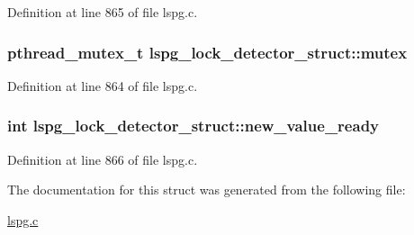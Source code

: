 Definition at line 865 of file lspg.\-c.

\hypertarget{structlspg__lock__detector__struct_ab5ab5534b376a8fbafdd0b54cec4483c}{
\subsubsection[{mutex}]{\setlength{\rightskip}{0pt plus 5cm}pthread\-\_\-mutex\-\_\-t lspg\-\_\-lock\-\_\-detector\-\_\-struct\-::mutex}}\label{structlspg__lock__detector__struct_ab5ab5534b376a8fbafdd0b54cec4483c}


Definition at line 864 of file lspg.\-c.

\hypertarget{structlspg__lock__detector__struct_a62373414b815fe178edd8522b3bd4d78}{
\subsubsection[{new\-\_\-value\-\_\-ready}]{\setlength{\rightskip}{0pt plus 5cm}int lspg\-\_\-lock\-\_\-detector\-\_\-struct\-::new\-\_\-value\-\_\-ready}}\label{structlspg__lock__detector__struct_a62373414b815fe178edd8522b3bd4d78}


Definition at line 866 of file lspg.\-c.



The documentation for this struct was generated from the following file\-:\begin{DoxyCompactItemize}
\item 
\hyperlink{lspg_8c}{lspg.\-c}\end{DoxyCompactItemize}
